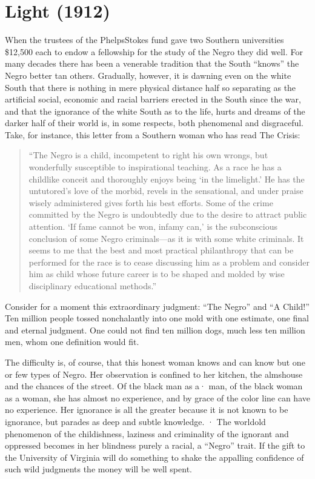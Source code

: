 \documentclass[letterpaper,10pt,english]{jupyterBook}
\begin{document}
\section{Light (1912)}
\label{\detokenize{Volumes/03/04/light:light-1912}}\label{\detokenize{Volumes/03/04/light::doc}}
\sphinxAtStartPar
When the trustees of the Phelps\sphinxhyphen{}Stokes fund gave two Southern universities \$12,500 each to endow a fellowship for the study of the Negro they did well. For many decades there has been a venerable tradition that the South “knows” the Negro better tan others. Gradually, however, it is dawning even on the white South that	there	is nothing in mere physical distance half so separating as the artificial social, economic and racial barriers erected in the South since the war, and that the ignorance of the white South as to the life, hurts and dreams of the darker half of their world is, in some respects, both phenomenal and disgraceful. Take, for instance, this letter from a Southern woman who has read The Crisis:
\begin{quote}

\sphinxAtStartPar
“The Negro is a child, incompetent to right his own wrongs, but wonderfully susceptible to inspirational teaching. As a race he has a childlike conceit and thoroughly enjoys being ‘in the limelight.’ He has the untutored’s love of the morbid, revels in the sensational, and under praise wisely ad­ministered gives forth his best efforts. Some of the crime committed by the Negro is undoubtedly due to the de­sire to attract public attention. ‘If fame cannot be won, infamy can,’ is the subconscious conclusion of some Negro criminals—as it is with some white criminals. It seems to me that the best and most practical philan­thropy that can be performed for the race is to cease discussing him as a problem and consider him as child whose future career is to be shaped and molded by wise disciplin­ary educational methods.”
\end{quote}

\sphinxAtStartPar
Consider for a moment this extraordinary judgment: “The Negro” and “A Child!” Ten million people tossed nonchalantly into one mold with one estimate, one final and eternal judg­ment. One could not find ten million dogs, much less ten million men, whom one definition would fit.

\sphinxAtStartPar
The difficulty is, of course, that this honest woman knows and can know but one or few types of Negro. Her observation is confined to her kitchen, the almshouse and the chances of the street. Of the black man as a· man, of the black woman as a woman, she has almost no experience, and by grace of the color line can have no experience. Her ignorance is all the greater because it is not known to be ignorance, but parades as deep and subtle knowl­edge. · The world\sphinxhyphen{}old phenomenon of the childishness, laziness and crimi­nality of the ignorant and oppressed becomes in her blindness purely a racial, a “Negro” trait. If the gift to the University of Virginia will do something to shake the appalling con­fidence of such wild judgments the money will be well spent.
\end{document}
